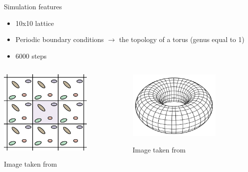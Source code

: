 \documentclass{beamer}
\begin{document}
\begin{frame}{Simulation features}
\begin{itemize}
\item 10x10 lattice 
\item Periodic boundary conditions $\rightarrow$ the topology of a torus (genus equal to 1) 
\item 6000 steps 
\end{itemize}
\begin{columns}
\begin{column}{0.5\textwidth}
    \begin{center}
     \includegraphics[width=0.7\textwidth]{Pic/PBC.png}
      \end{center}
      \begin{center}
          Image taken from \cite{PBC}
     \end{center}
\end{column}
\begin{column}{0.5\textwidth}

    \begin{center}
     \includegraphics[width=0.7\textwidth]{Pic/Torus.png}
      \end{center}
      \begin{center}
          Image taken from \cite{PBC}
     \end{center}

\end{column}
\end{columns}
\end{frame}
\end{document}
